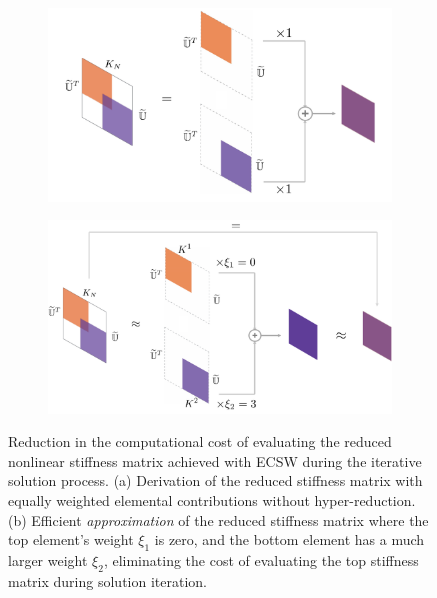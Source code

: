 \documentclass[11pt]{article}
\begin{document}
\begin{figure}[t]
    \centering
    \begin{subfigure}{0.48\linewidth}
        \hspace{-15pt}
        \includegraphics[width=\linewidth]{K_red.pdf}
        \caption{}
        \label{fig:visual_FOM_FEA_2}
    \end{subfigure}%
\begin{subfigure}{0.48\linewidth}
        \centering
        \includegraphics[width=\linewidth]{K_hyper_red.pdf}
        \caption{}
        \label{fig:visual_ROM_FEA}
    \end{subfigure}
\caption{Reduction in the computational cost of evaluating the reduced nonlinear stiffness matrix achieved with ECSW during the iterative solution process. (a) Derivation of the reduced stiffness matrix with equally weighted elemental contributions without hyper-reduction. (b) Efficient \textit{approximation} of the reduced stiffness matrix where the top element's weight \(\xi_1\) is zero, and the bottom element has a much larger weight \(\xi_2\), eliminating the cost of evaluating the top stiffness matrix during solution iteration.}
\label{fig:stiffness_matrices}
\end{figure}
\end{document}
